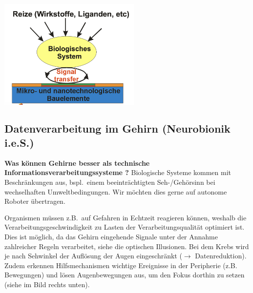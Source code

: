 \begin{center}
    \includegraphics[width=7cm]{lec8/figures/biohybrid.png}
\end{center}

\subsection{Datenverarbeitung im Gehirn (Neurobionik i.e.S.)}

\textbf{Was können Gehirne besser als technische Informationsverarbeitungssysteme \dangersign?} Biologische Systeme kommen mit Beschränkungen aus, bspl.\ einem beeinträchtigten Seh-/Gehörsinn bei wechselhaften Umweltbedingungen. Wir möchten dies gerne auf autonome Roboter übertragen.

Organismen müssen z.B.\ auf Gefahren in Echtzeit reagieren können, weshalb die Verarbeitungsgeschwindigkeit zu Lasten der Verarbeitungsqualität optimiert ist. Dies ist möglich, da das Gehirn eingehende Signale unter der Annahme zahlreicher Regeln verarbeitet, siehe die optischen Illusionen. Bei dem Krebs wird je nach Sehwinkel der Auflösung der Augen eingeschränkt ($\rightarrow$ Datenreduktion). Zudem erkennen Hilfsmechanismen wichtige Ereignisse in der Peripherie (z.B. Bewegungen) und lösen Augenbewegungen aus, um den Fokus dorthin zu setzen (siehe im Bild rechts unten).

